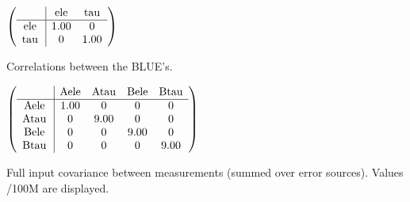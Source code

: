 \begin{table}[H]
\scriptsize
\begin{center}
\renewcommand{\arraystretch}{1.1}
\begin{math}\left(\begin{array}{c|cc}
 & \mathrm{ele} & 
\mathrm{tau} \\
\hline
\mathrm{ele} \hspace*{2pt} &       1.00 &  0 \\
\mathrm{tau} \hspace*{2pt} &  0 &       1.00 \\
\end{array}\right)\end{math}
\caption{Correlations between the BLUE's.}
\renewcommand{\arraystretch}{1}
\end{center}
\end{table}
\begin{table}[H]
\scriptsize
\begin{center}
\renewcommand{\arraystretch}{1.1}
\begin{math}\left(\begin{array}{c|cccc}
 & \mathrm{Aele} & 
\mathrm{Atau} & 
\mathrm{Bele} & 
\mathrm{Btau} \\
\hline
\mathrm{Aele} \hspace*{2pt} &       1.00 &  0 &  0 &  0 \\
\mathrm{Atau} \hspace*{2pt} &  0 &       9.00 &  0 &  0 \\
\mathrm{Bele} \hspace*{2pt} &  0 &  0 &       9.00 &  0 \\
\mathrm{Btau} \hspace*{2pt} &  0 &  0 &  0 &       9.00 \\
\end{array}\right)\end{math}
\caption{Full input covariance between measurements (summed over error sources). Values /100M are displayed.}
\renewcommand{\arraystretch}{1}
\end{center}
\end{table}
